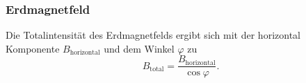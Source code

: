 \subsubsection{Erdmagnetfeld}
Die Totalintensität des Erdmagnetfelds ergibt sich mit der horizontal Komponente $B_\text{horizontal}$ und dem Winkel $\varphi$ zu %
\begin{equation}
    B_\text{total} = \frac{B_\text{horizontal}}{\cos{\varphi}}.
    \label{eqn:btotal}
\end{equation}
